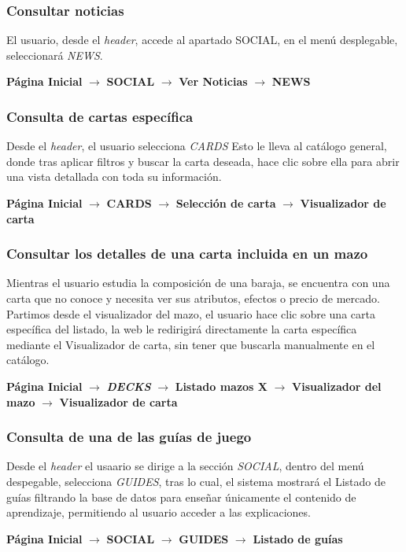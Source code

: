 \documentclass[10pt]{article}
\begin{document}
	\subsubsection{Consultar noticias}
	El usuario, desde  el \textit{header}, accede al apartado SOCIAL, en el menú desplegable, seleccionará \textit{NEWS}.
	\begin{center}
		\textbf{Página Inicial} $\rightarrow$ \textbf{SOCIAL} $\rightarrow$ \textbf{Ver Noticias} $\rightarrow$ \textbf{NEWS}
	\end{center}
	
	\subsubsection{Consulta de cartas específica }
	Desde el \textit{header}, el usuario selecciona \textit{CARDS} Esto le lleva al catálogo general, donde tras aplicar filtros y buscar la carta deseada, hace clic sobre ella para abrir una vista detallada con toda su información.
	\begin{center}
		\textbf{Página Inicial} $\rightarrow$ \textbf{CARDS} $\rightarrow$ \textbf{Selección de carta} $\rightarrow$ \textbf{Visualizador de carta}
	\end{center}
	
	\subsubsection{Consultar los detalles de una carta incluida en un mazo}
	Mientras el usuario estudia la composición de una baraja, se encuentra con una carta que no conoce y necesita ver sus atributos, efectos o precio de mercado.\\
	Partimos desde el  visualizador del mazo, el usuario hace clic sobre una carta específica del listado, la web le redirigirá directamente la carta específica mediante el Visualizador de carta, sin tener que buscarla manualmente en el catálogo.
	\begin{center}
		\textbf{Página Inicial} $\rightarrow$ \textbf{\textit{DECKS}} $\rightarrow$ \textbf{Listado mazos X} $\rightarrow$ \textbf{Visualizador del mazo} $\rightarrow$ \textbf{Visualizador de carta}
	\end{center}
	
	\subsubsection{Consulta de una de las guías de juego}
	Desde el \textit{header} el usaario se dirige a la sección \textit{SOCIAL}, dentro del menú despegable, selecciona \textit{GUIDES}, tras lo cual, el sistema mostrará el Listado de guías filtrando la base de datos para enseñar únicamente el contenido de aprendizaje, permitiendo al usuario acceder a las explicaciones.
	\begin{center}
		\textbf{Página Inicial} $\rightarrow$ \textbf{SOCIAL} $\rightarrow$ \textbf{GUIDES} $\rightarrow$ \textbf{Listado de guías}
	\end{center}
	
\end{document}
